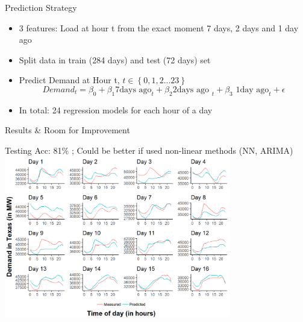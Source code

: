 \documentclass[ignorenonframetext,]{beamer}
\begin{document}
\begin{frame}{Prediction Strategy}

\begin{itemize}
\item
  3 features: Load at hour t from the exact moment 7 days, 2 days and 1
  day ago
\item
  Split data in train (284 days) and test (72 days) set
\item
  Predict Demand at Hour t, \(t \in \left \{0,1,2...23 \right \}\)
  \[ Demand_{t}=\beta_{0}+\beta_{1} \text {7days ago}_{t}+\beta_{2} \text {2days ago }_{t}+\beta_{3} \text { 1day ago}_{t} + \epsilon\]
\item
  In total: 24 regression models for each hour of a day
\end{itemize}

\end{frame}

\begin{frame}{Results \& Room for Improvement}

Testing Acc: 81\% ; Could be better if used non-linear methods (NN,
ARIMA)
\includegraphics[width=0.74000\textwidth]{README-unnamed-chunk-8-1.png}

\end{frame}
\end{document}
